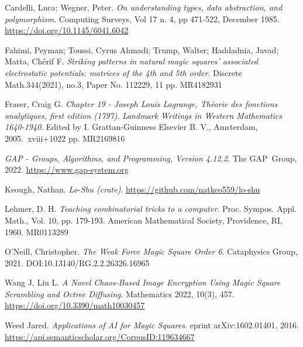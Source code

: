 \documentclass{rhumj_new}
\begin{document}
\begin{thebibliography}{10}
  Cardelli, Luca; Wegner, Peter.
    {\it On understanding types, data abstraction, and polymorphism}.
  Computing Surveys, Vol 17 n. 4, pp 471-522, December 1985.
  \url{https://doi.org/10.1145/6041.6042}

  Fahimi, Peyman; Toussi, Cyrus Ahmadi; Trump, Walter; Haddadnia, Javad; Matta, Chérif F.
    {\it Striking patterns in natural magic squares' associated electrostatic potentials:
      matrices of the 4th and 5th order}.
  Discrete Math.344(2021), no.3, Paper No. 112229, 11 pp.
  MR4182931

  Fraser, Craig G.
    {\it Chapter 19 - Joseph Louis Lagrange, Théorie des fonctions analytiques, first edition
      (1797)}.
  {\it Landmark Writings in Western Mathematics 1640-1940}.
  Edited by I. Grattan-Guinness Elsevier B. V., Amsterdam, 2005.\ xviii+1022 pp.
  MR2169816

  {\it GAP - Groups, Algorithms, and Programming, Version 4.12.2}.
  The GAP~Group, 2022.
  \url{https://www.gap-system.org}

  Keough, Nathan.
    {\it Lo-Shu (crate)}.
  \url{https://github.com/natkeo559/lo-shu}

  Lehmer, D. H.
    {\it Teaching combinatorial tricks to a computer}.
  Proc. Sympos. Appl. Math., Vol. 10, pp. 179-193.
  American Mathematical Society, Providence, RI, 1960.
  MR0113289

  O'Neill, Christopher.
    {\it The Weak Force Magic Square Order 6}.
  Cataphysics Group, 2021.
  DOI:10.13140/RG.2.2.26326.16965

  Wang J, Liu L.
    {\it A Novel Chaos-Based Image Encryption Using Magic Square Scrambling and Octree Diffusing}.
  Mathematics 2022, 10(3), 457.
  \url{https://doi.org/10.3390/math10030457}

  Weed Jared.
    {\it Applications of AI for Magic Squares}.
  eprint arXiv:1602.01401, 2016.
  \url{https://api.semanticscholar.org/CorpusID:119634667}

\end{thebibliography}
\end{document}
